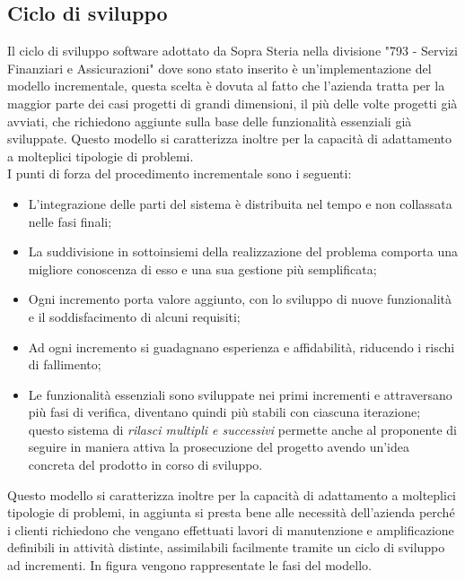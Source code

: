 	\subsection{Ciclo di sviluppo}
	
	Il ciclo di sviluppo software adottato da Sopra Steria nella divisione "793 - Servizi Finanziari e Assicurazioni" dove sono stato inserito è un'implementazione del modello incrementale, questa scelta è dovuta al fatto che l'azienda tratta per la maggior parte dei casi progetti di grandi dimensioni, il più delle volte progetti già avviati, che richiedono aggiunte sulla base delle funzionalità essenziali già sviluppate. Questo modello si caratterizza inoltre per la capacità di adattamento a molteplici tipologie di problemi.\\
	
	I punti di forza del procedimento incrementale sono i seguenti:
	\begin{itemize}
		\item L'integrazione delle parti del sistema è distribuita nel tempo e non collassata nelle fasi finali;
		\item La suddivisione in sottoinsiemi della realizzazione del problema comporta una migliore conoscenza di esso e una sua gestione più semplificata;
		\item Ogni incremento porta valore aggiunto, con lo sviluppo di nuove funzionalità e il soddisfacimento di alcuni requisiti;
		\item Ad ogni incremento si guadagnano esperienza e affidabilità, riducendo i rischi di fallimento;
		\item Le funzionalità essenziali sono sviluppate nei primi incrementi e attraversano più fasi di verifica, diventano quindi più stabili con ciascuna iterazione; questo sistema di \textit{rilasci multipli e successivi} permette anche al proponente di seguire in maniera attiva la prosecuzione del progetto avendo un'idea concreta del prodotto in corso di sviluppo.
	\end{itemize}
	
	 Questo modello si caratterizza inoltre per la capacità di adattamento a molteplici tipologie di problemi, in aggiunta si presta bene alle necessità dell'azienda perché i clienti richiedono che vengano effettuati lavori di manutenzione e amplificazione definibili in attività distinte, assimilabili facilmente tramite un ciclo di sviluppo ad incrementi. In figura vengono rappresentate le fasi del modello.\\
	
